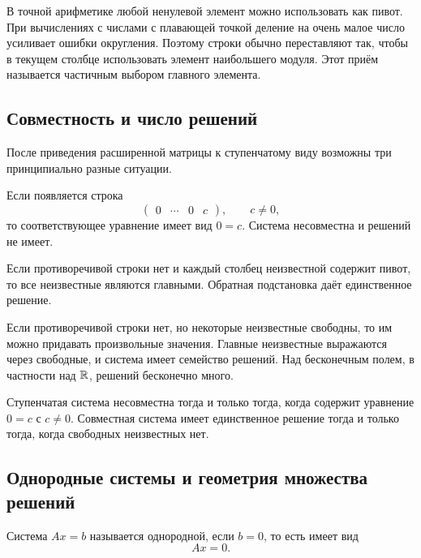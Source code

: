 \begin{computationalnote}
В точной арифметике любой ненулевой элемент можно использовать как пивот. При вычислениях с числами с плавающей точкой деление на очень малое число усиливает ошибки округления. Поэтому строки обычно переставляют так, чтобы в текущем столбце использовать элемент наибольшего модуля. Этот приём называется частичным выбором главного элемента.
\end{computationalnote}

\subsection{Совместность и число решений}

После приведения расширенной матрицы к ступенчатому виду возможны три принципиально разные ситуации.

Если появляется строка
\[
\left(
\begin{array}{ccc|c}
0&\cdots&0&c
\end{array}
\right),
\qquad c\neq 0,
\]
то соответствующее уравнение имеет вид \(0=c\). Система несовместна и решений не имеет.

Если противоречивой строки нет и каждый столбец неизвестной содержит пивот, то все неизвестные являются главными. Обратная подстановка даёт единственное решение.

Если противоречивой строки нет, но некоторые неизвестные свободны, то им можно придавать произвольные значения. Главные неизвестные выражаются через свободные, и система имеет семейство решений. Над бесконечным полем, в частности над \(\mathbb{R}\), решений бесконечно много.

\begin{criterion}
Ступенчатая система несовместна тогда и только тогда, когда содержит уравнение \(0=c\) с \(c\neq 0\). Совместная система имеет единственное решение тогда и только тогда, когда свободных неизвестных нет.
\end{criterion}

\subsection{Однородные системы и геометрия множества решений}

\begin{definition}
Система \(Ax=b\) называется однородной, если \(b=0\), то есть имеет вид
\[
Ax=0.
\]
\end{definition}

